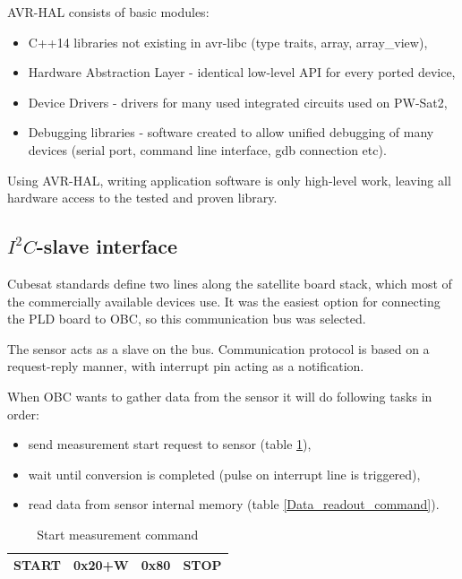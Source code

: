     AVR-HAL consists of basic modules:
    \begin{itemize}
        \item C++14 libraries not existing in avr-libc (type traits, array, array\_view),
        \item Hardware Abstraction Layer - identical low-level API for every ported device,
        \item Device Drivers - drivers for many used integrated circuits used on PW-Sat2,
        \item Debugging libraries - software created to allow unified debugging of many devices (serial port, command line interface, gdb connection etc).
    \end{itemize}

    Using AVR-HAL, writing application software is only high-level work, leaving all hardware access to the tested and proven library.

    \subsection{$I^2C$-slave interface}
    Cubesat standards define two \iic lines along the satellite board stack, which most of the commercially available devices use. It was the easiest option for connecting the PLD board to OBC, so this communication bus was selected.

    The sensor acts as a slave on the \iic bus. Communication protocol is based on a request-reply manner, with interrupt pin acting as a notification.

    When OBC wants to gather data from the sensor it will do following tasks in order:
    \begin{itemize}
        \item send measurement start request to sensor (table \ref{Start_measurement_command}),
        \item wait until conversion is completed (pulse on interrupt line is triggered),
        \item read data from sensor internal memory (table \ref{Data_readout_command}).
    \end{itemize}

    \begin{table}[H]
        \begin{center}
            \begin{tabular}{|c|c|c|c|}
                \hline
                START & 0x20+W & 0x80 & STOP \\ \hline
            \end{tabular}
        \end{center}
        \caption{Start measurement command}
        \label{Start_measurement_command}
    \end{table}

